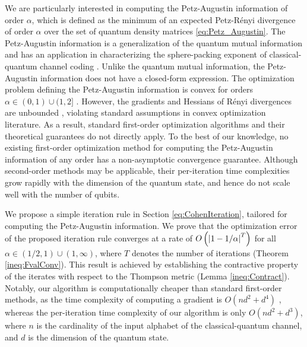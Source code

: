 \documentclass{article}
\begin{document}
We are particularly interested in computing the Petz-Augustin information of order $\alpha$, which is defined as the minimum of an expected Petz-R\'{e}nyi divergence of order 
$\alpha$ over the set of quantum density matrices \eqref{eq:Petz_Augustin}.
The Petz-Augustin information is a generalization of the quantum mutual information and has an application in characterizing the sphere-packing exponent of classical-quantum channel coding \cite{Dalai2014, Cheng2019}.
Unlike the quantum mutual information, the Petz-Augustin information does not have a closed-form expression.
The optimization problem defining the Petz-Augustin information is convex for orders $\alpha \in (0, 1) \cup (1, 2]$ \cite{Mosonyi2017}. 
However, the gradients and Hessians of R{\'e}nyi divergences are unbounded \cite[Propositions 3.1 and 3.2]{You2022}, 
violating standard assumptions in convex optimization literature. 
As a result, standard first-order optimization algorithms and their theoretical guarantees do not directly apply.
To the best of our knowledge, no existing first-order optimization method for computing the Petz-Augustin information of any order 
has a non-asymptotic convergence guarantee.  
Although second-order methods \cite{Nesterov2018a} may be applicable, their per-iteration time complexities grow rapidly with the dimension of the quantum state, and hence do not scale well with the number of qubits.

We propose a simple iteration rule in Section \ref{eq:CohenIteration}, tailored for computing the Petz-Augustin information.
We prove that the optimization error of the proposed iteration rule converges at a rate of $O\left(\abs{1-1/\alpha}^T\right)$ for all $\alpha \in (1/2,1)\cup(1,\infty)$, where $T$ denotes the number of iterations (Theorem \ref{ineq:FvalConv}).
This result is achieved by establishing the contractive property of the iterates with respect to the Thompson metric (Lemma \ref{ineq:Contract}).
Notably, our algorithm is computationally cheaper than standard first-order methods, as
the time complexity of computing a gradient is $O\left(nd^2+d^4\right)$ \cite{You2022}, whereas the per-iteration time complexity of our algorithm is only $O\left(n d^2+d^3\right)$, where $n$ is the cardinality of the input alphabet of the classical-quantum channel, and $d$ is the dimension of the quantum state.
\end{document}
